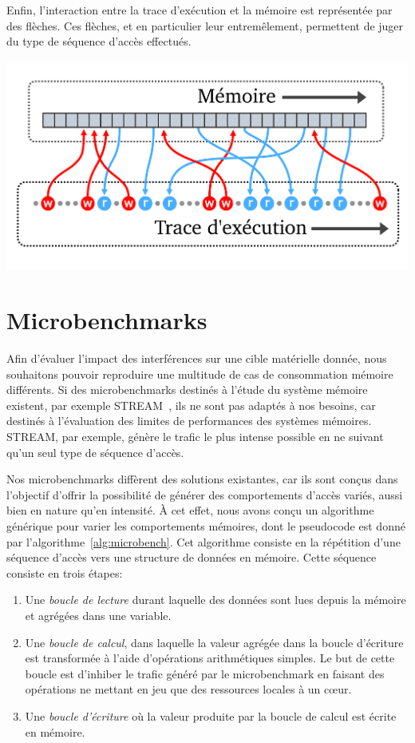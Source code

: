 Enfin, l'interaction entre la trace d'exécution et la mémoire est représentée par des flèches.
Ces flèches, et en particulier leur entremêlement, permettent de juger du type de séquence d'accès effectués.

\begin{center}
	\includegraphics[width=0.8\linewidth]{graphics/figures/template-profils-evenementiels-all.pdf}
\end{center}

\section{Microbenchmarks}

Afin d'évaluer l'impact des interférences sur une cible matérielle donnée, nous souhaitons pouvoir reproduire une multitude de cas de consommation mémoire différents.
Si des microbenchmarks destinés à l'étude du système mémoire existent, par exemple \textsc{STREAM}~\cite{McCalpin1995}, ils ne sont pas adaptés à nos besoins, car destinés à l'évaluation des limites de performances des systèmes mémoires.
\textsc{STREAM}, par exemple, génère le trafic le plus intense possible en ne suivant qu'un seul type de séquence d'accès.

Nos microbenchmarks diffèrent des solutions existantes, car ils sont conçus dans l'objectif d'offrir la possibilité de générer des comportements d'accès variés, aussi bien en nature qu'en intensité.
À cet effet, nous avons conçu un algorithme générique pour varier les comportements mémoires, dont le pseudocode est donné par l'algorithme~\ref{alg:microbench}.
Cet algorithme consiste en la répétition d'une séquence d'accès vers une structure de données en mémoire.
Cette séquence consiste en trois étapes:
\begin{enumerate}
	\item Une \emph{boucle de lecture} durant laquelle des données sont lues depuis la mémoire et agrégées dans une variable.
	\item Une \emph{boucle de calcul}, dans laquelle la valeur agrégée dans la boucle d'écriture est transformée à l'aide d'opérations arithmétiques simples.
	Le but de cette boucle est d'inhiber le trafic généré par le microbenchmark en faisant des opérations ne mettant en jeu que des ressources locales à un cœur.
	\item Une \emph{boucle d'écriture} où la valeur produite par la boucle de calcul est écrite en mémoire.
\end{enumerate}

